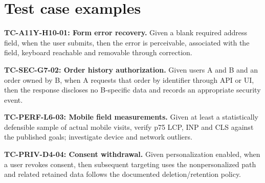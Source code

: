 \documentclass[11pt]{article}
\begin{document}
\section{Test case examples}

\textbf{TC-A11Y-H10-01: Form error recovery.} Given a blank required address field, when the user submits, then the error is perceivable, associated with the field, keyboard reachable and removable through correction.

\textbf{TC-SEC-G7-02: Order history authorization.} Given users A and B and an order owned by B, when A requests that order by identifier through API or UI, then the response discloses no B-specific data and records an appropriate security event.

\textbf{TC-PERF-L6-03: Mobile field measurements.} Given at least a statistically defensible sample of actual mobile visits, verify p75 LCP, INP and CLS against the published goals; investigate device and network outliers.

\textbf{TC-PRIV-D4-04: Consent withdrawal.} Given personalization enabled, when a user revokes consent, then subsequent targeting uses the nonpersonalized path and related retained data follows the documented deletion/retention policy.


\clearpage

\end{document}
